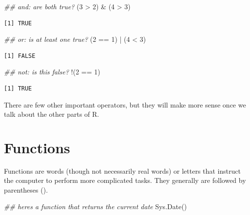 \documentclass[
  letterpaper,
  DIV=11,
  numbers=noendperiod]{scrreprt}
\newenvironment{Shaded}{\begin{snugshade}}{\end{snugshade}}
\newcommand{\DecValTok}[1]{\textcolor[rgb]{0.68,0.00,0.00}{#1}}
\newcommand{\DocumentationTok}[1]{\textcolor[rgb]{0.37,0.37,0.37}{\textit{#1}}}
\newcommand{\FunctionTok}[1]{\textcolor[rgb]{0.28,0.35,0.67}{#1}}
\newcommand{\NormalTok}[1]{\textcolor[rgb]{0.00,0.23,0.31}{#1}}
\newcommand{\SpecialCharTok}[1]{\textcolor[rgb]{0.37,0.37,0.37}{#1}}
\begin{document}
\begin{Shaded}
\begin{Highlighting}[]
\DocumentationTok{\#\# and: are both true?}
\NormalTok{(}\DecValTok{3} \SpecialCharTok{\textgreater{}} \DecValTok{2}\NormalTok{) }\SpecialCharTok{\&}\NormalTok{ (}\DecValTok{4} \SpecialCharTok{\textgreater{}} \DecValTok{3}\NormalTok{) }
\end{Highlighting}
\end{Shaded}

\begin{verbatim}
[1] TRUE
\end{verbatim}

\begin{Shaded}
\begin{Highlighting}[]
\DocumentationTok{\#\# or: is at least one true?}
\NormalTok{(}\DecValTok{2} \SpecialCharTok{==} \DecValTok{1}\NormalTok{) }\SpecialCharTok{|}\NormalTok{ (}\DecValTok{4} \SpecialCharTok{\textless{}} \DecValTok{3}\NormalTok{)}
\end{Highlighting}
\end{Shaded}

\begin{verbatim}
[1] FALSE
\end{verbatim}

\begin{Shaded}
\begin{Highlighting}[]
\DocumentationTok{\#\# not: is this false?}
\SpecialCharTok{!}\NormalTok{(}\DecValTok{2} \SpecialCharTok{==} \DecValTok{1}\NormalTok{)}
\end{Highlighting}
\end{Shaded}

\begin{verbatim}
[1] TRUE
\end{verbatim}

There are few other important operators, but they will make more sense
once we talk about the other parts of R.

\section{Functions}\label{functions}

Functions are words (though not necessarily real words) or letters that
instruct the computer to perform more complicated tasks. They generally
are followed by parentheses ().

\begin{Shaded}
\begin{Highlighting}[]
\DocumentationTok{\#\# here\textquotesingle{}s a function that returns the current date}
\FunctionTok{Sys.Date}\NormalTok{()}
\end{Highlighting}
\end{Shaded}
\end{document}
